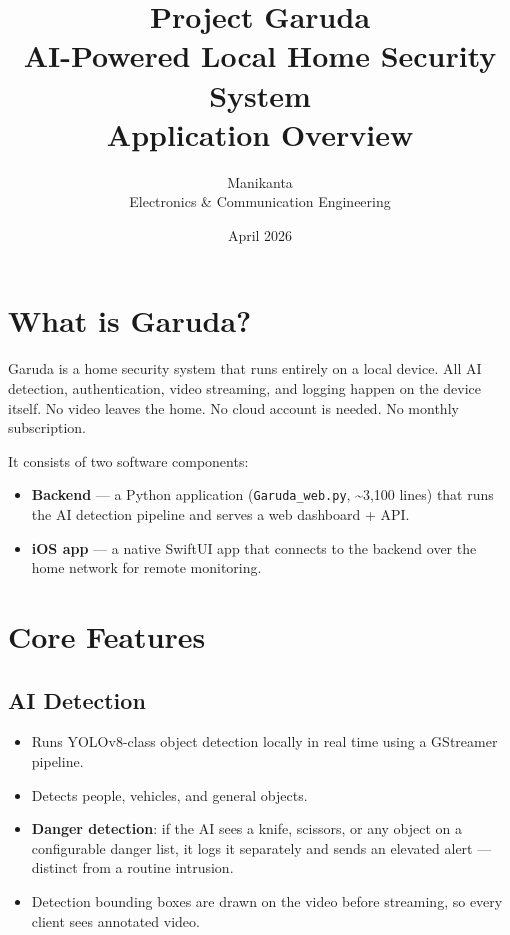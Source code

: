 \documentclass[12pt,a4paper]{article}
\title{
    \textbf{Project Garuda} \\[0.3em]
    \large AI-Powered Local Home Security System \\[0.2em]
    \normalsize Application Overview
}
\author{Manikanta \\ Electronics \& Communication Engineering}
\date{April 2026}
\begin{document}
\maketitle
\thispagestyle{fancy}

\section*{What is Garuda?}

Garuda is a home security system that runs entirely on a local device.
All AI detection, authentication, video streaming, and logging happen
on the device itself. No video leaves the home. No cloud account is
needed. No monthly subscription.

It consists of two software components:
\begin{itemize}[leftmargin=2em]
  \item \textbf{Backend} — a Python application (\texttt{Garuda\_web.py},
        \textasciitilde3,100 lines) that runs the AI detection pipeline and
        serves a web dashboard + API.
  \item \textbf{iOS app} — a native SwiftUI app that connects to the backend
        over the home network for remote monitoring.
\end{itemize}

\section*{Core Features}

\subsection*{AI Detection}
\begin{itemize}[leftmargin=2em, itemsep=2pt]
  \item Runs YOLOv8-class object detection locally in real time using a
        GStreamer pipeline.
  \item Detects people, vehicles, and general objects.
  \item \textbf{Danger detection}: if the AI sees a knife, scissors, or
        any object on a configurable danger list, it logs it separately
        and sends an elevated alert — distinct from a routine intrusion.
  \item Detection bounding boxes are drawn on the video before streaming,
        so every client sees annotated video.
\end{itemize}
\end{document}

